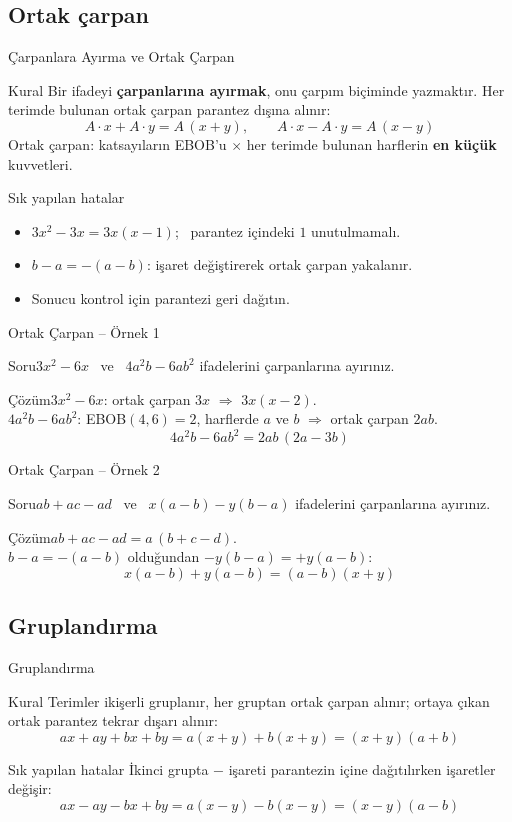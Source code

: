 \documentclass[aspectratio=169,11pt]{beamer}
\newcommand{\soru}[3]{%
\begin{frame}{#1}
  \begin{block}{Soru}\large #2\end{block}
  \pause
  \begin{exampleblock}{Çözüm}\large #3\end{exampleblock}
\end{frame}}
\begin{document}
\subsection{Ortak çarpan}
\begin{frame}{Çarpanlara Ayırma ve Ortak Çarpan}
\begin{block}{Kural}
Bir ifadeyi \textbf{çarpanlarına ayırmak}, onu çarpım biçiminde yazmaktır. Her terimde bulunan ortak çarpan parantez dışına alınır:
\[A\cdot x+A\cdot y=A\,(x+y),\qquad A\cdot x-A\cdot y=A\,(x-y)\]
Ortak çarpan: katsayıların EBOB'u \(\times\) her terimde bulunan harflerin \textbf{en küçük} kuvvetleri.
\end{block}
\begin{alertblock}{Sık yapılan hatalar}
\begin{itemize}
\item \(3x^2-3x=3x(x-1)\); \ parantez içindeki \(1\) unutulmamalı.
\item \(b-a=-(a-b)\): işaret değiştirerek ortak çarpan yakalanır.
\item Sonucu kontrol için parantezi geri dağıtın.
\end{itemize}
\end{alertblock}
\end{frame}

\soru{Ortak Çarpan -- Örnek 1}
{\(3x^2-6x\) \ ve \ \(4a^2b-6ab^2\) ifadelerini çarpanlarına ayırınız.}
{\(3x^2-6x\): ortak çarpan \(3x\) \(\Rightarrow\) \(3x(x-2)\).\\[3pt]
\(4a^2b-6ab^2\): EBOB\((4,6)=2\), harflerde \(a\) ve \(b\) \(\Rightarrow\) ortak çarpan \(2ab\).
\[4a^2b-6ab^2=2ab\,(2a-3b)\]}

\soru{Ortak Çarpan -- Örnek 2}
{\(ab+ac-ad\) \ ve \ \(x(a-b)-y(b-a)\) ifadelerini çarpanlarına ayırınız.}
{\(ab+ac-ad=a\,(b+c-d)\).\\[3pt]
\(b-a=-(a-b)\) olduğundan \(-y(b-a)=+y(a-b)\):
\[x(a-b)+y(a-b)=(a-b)(x+y)\]}

\subsection{Gruplandırma}
\begin{frame}{Gruplandırma}
\begin{block}{Kural}
Terimler ikişerli gruplanır, her gruptan ortak çarpan alınır; ortaya çıkan ortak parantez tekrar dışarı alınır:
\[ax+ay+bx+by=a(x+y)+b(x+y)=(x+y)(a+b)\]
\end{block}
\begin{alertblock}{Sık yapılan hatalar}
İkinci grupta \(-\) işareti parantezin içine dağıtılırken işaretler değişir:
\[ax-ay-bx+by=a(x-y)-b(x-y)=(x-y)(a-b)\]
\end{alertblock}
\end{frame}
\end{document}
